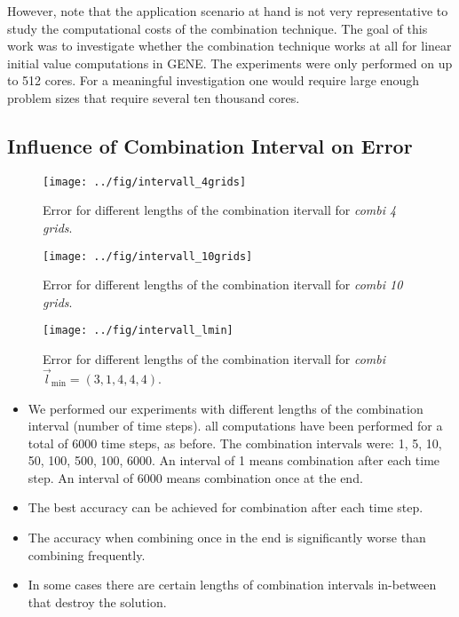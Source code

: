 \documentclass{scrartcl}
\newcommand{\lmin}{\vec{l}_{\text{min}}}
\begin{document}
\begin{itemize}
	However, note that the application scenario at hand is not very representative to study the computational costs of the combination technique.
	The goal of this work was to investigate whether the combination technique works at all for linear initial value computations in GENE.
	The experiments were only performed on up to 512 cores. 
	For a meaningful investigation one would require large enough problem sizes that require several ten thousand cores.
	
\end{itemize}

\subsection*{Influence of Combination Interval on Error}

\begin{figure}[h!]
	\centering
	\texttt{[image: ../fig/intervall\_4grids]}
	\caption{Error for different lengths of the combination itervall for \textit{combi 4 grids}. }
	\label{fig:intervall_4}
\end{figure}

\begin{figure}[h!]
	\centering
	\texttt{[image: ../fig/intervall\_10grids]}
	\caption{Error for different lengths of the combination itervall for \textit{combi 10 grids}. }
	\label{fig:intervall_10}
\end{figure}

\begin{figure}[h!]
	\centering
	\texttt{[image: ../fig/intervall\_lmin]}
	\caption{Error for different lengths of the combination itervall for \textit{combi $\lmin = (3,1,4,4,4)$}. }
	\label{fig:intervall_lmin}
\end{figure}

\begin{itemize}
	\item We performed our experiments with different lengths of the combination interval (number of time steps). all computations have been performed for a total of 6000 time steps, as before. The combination intervals were: 1, 5, 10, 50, 100, 500, 100, 6000. An interval of 1 means combination after each time step. An interval of 6000 means combination once at the end.
	
	\item The best accuracy can be achieved for combination after each time step.
	
	\item The accuracy when combining once in the end is significantly worse than combining frequently.
	
	\item In some cases there are certain lengths of combination intervals in-between that destroy the solution.
\end{itemize}
\end{document}
